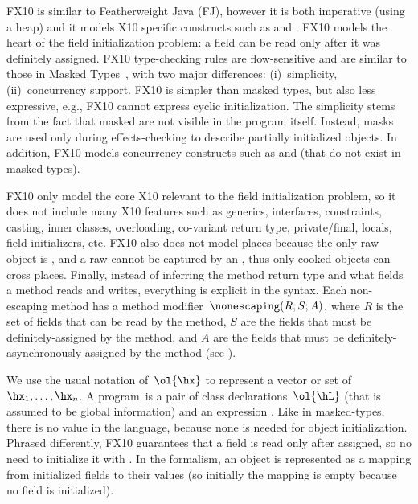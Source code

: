 FX10 is similar to Featherweight Java (FJ), however it is both imperative (using a heap) and it
    models X10 specific constructs such as \finish and \async.
FX10 models the heart of the field initialization problem:
    a field can be read only after it  was definitely assigned.
FX10 type-checking rules are flow-sensitive and are similar to those in Masked Types~\cite{XinQi:2009},
    with two major differences:
    (i)~simplicity,
    (ii)~concurrency support.
FX10 is simpler than masked types, but also less expressive, e.g., FX10 cannot express cyclic initialization.
The simplicity stems from the fact that masked are not visible in the program itself.
Instead, masks are used only during effects-checking to describe partially initialized objects.
In addition, FX10 models concurrency constructs such as \finish and \async (that do not exist in masked types).

FX10 only model the core X10 relevant to the field initialization problem,
    so it does not include many X10 features such as
    generics, interfaces, constraints, casting, inner classes, overloading, co-variant return type, private/final,
    locals, field initializers, etc.
FX10 also does not model places because the only raw object is \this,
        and a raw \this cannot be captured by an ,
        thus only cooked objects can cross places.
Finally, instead of inferring the method return type and what fields a method reads and writes,
    everything is explicit in the syntax.
Each non-escaping method has a method modifier~$\nonescaping(R;S;A)$, where
            $R$ is the set of fields that can be read by the method,
                $S$ are the fields that must be definitely-assigned by the method,
                and $A$ are the fields that must be definitely-asynchronously-assigned by the method
                (see ).

We use the usual notation of~$\ol{\hx}$ to represent a vector or set of~$\hx_1, \ldots,\hx_n$.
A program~\hP is a pair of class declarations~$\ol{\hL}$ (that is assumed to be global information)
    and an expression \he.
Like in masked-types, there is no \hnull value in the language, because none is needed for object initialization.
Phrased differently,
    FX10 guarantees that a field is read only after assigned, so no need to initialize it with \hnull.
In the formalism, an object is represented as a mapping from initialized fields to their values
    (so initially the mapping is empty because no field is initialized).

